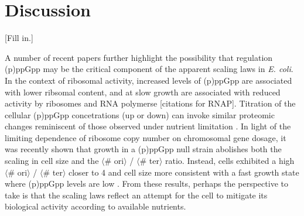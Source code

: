 \section{Discussion}

[Fill in.]



A number of recent papers further highlight the possibility that regulation
(p)ppGpp may be the critical component of the apparent scaling laws in
\textit{E. coli}. In the context of ribosomal activity, increased levels of
(p)ppGpp are associated with lower ribsomal content, and at slow growth
are associated with reduced activity by ribosomes and RNA polymerse \citep{dai2016,
dai2018} [citations for RNAP]. Titration of the cellular (p)ppGpp concetrations (up or down) can
invoke similar proteomic changes reminiscent of those observed under nutrient
limitation \citep{zhu2019}. In light of the limiting dependence of ribosome copy
number on chromosomal gene dosage, it was recently shown that growth in a
(p)ppGpp null strain abolishes both the scaling in cell size  and the
$\langle$\# ori$\rangle$ / $\langle$\# ter$\rangle$ ratio. Instead, cells
exhibited a high $\langle$\# ori$\rangle$ / $\langle$\# ter$\rangle$ closer to 4
and cell size more consistent with a fast growth state where (p)ppGpp levels are
low \citep{fernandezcoll2020}. From these results, perhaps the perspective to
take is that the scaling laws  reflect an attempt for the cell to mitigate its
biological activity according  to available nutrients.
